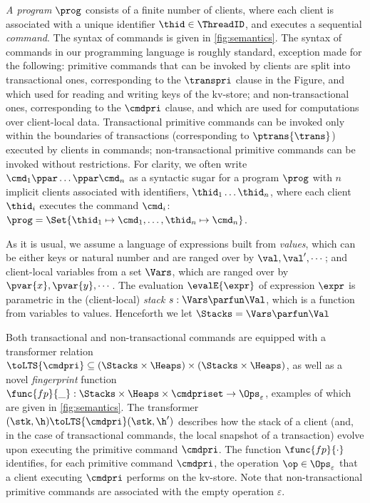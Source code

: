 \emph{A program} \( \prog \) consists of a finite number of clients, where each client is associated with a unique identifier \( \thid \in \ThreadID \), and executes a sequential \emph{command}. The syntax of commands is given in \cref{fig:semantics}. 
The syntax of commands in our programming language is roughly standard, exception made for the following: 
primitive commands that can be invoked by clients are split into transactional ones, corresponding to the $\transpri$ clause in the Figure, and which used for reading 
and writing keys of the kv-store; and non-transactional ones, corresponding to the $\cmdpri$ clause, and which are used for computations over client-local data. 
Transactional primitive commands can be invoked only within the boundaries of transactions (corresponding to $\ptrans{\trans}$) executed by clients in commands;
non-transactional primitive commands can be invoked without restrictions.
For clarity, we often write \( \cmd_{1}\ppar \dots \ppar \cmd_{n}\) as a syntactic sugar for a program \( \prog \) with $n$ implicit clients associated with identifiers, $\thid_1 \dots \thid_n$, where each client $\thid_i$ executes the command $\cmd_i$:  \( \prog = \Set{\thid_{1} \mapsto \cmd_{1}, \dots, \thid_{n} \mapsto \cmd_{n}  }\).

As it is usual, we assume a language of expressions 
built from \emph{values}, which can be either keys or natural number and are ranged over by $\val, \val', \cdots$; 
and client-local variables from a set $\Vars$, which are ranged over by $\pvar{x}, \pvar{y}, \cdots$. The evaluation $\evalE{\expr}$ of  expression 
$\expr$  is parametric in the (client-local) \emph{stack} $s: \Vars \parfun \Val$, which is a function from variables to values. 
Henceforth we let $\Stacks = \Vars \parfun \Val$

Both transactional and non-transactional commands are equipped with a transformer relation $\toLTS{\cmdpri} \subseteq 
(\Stacks \times \Heaps) \times (\Stacks \times \Heaps)$, as well as a 
novel \emph{fingerprint} function $\func{fp}{\_} : \Stacks \times \Heaps \times \cmdpriset \rightarrow \Ops_{\varepsilon}$, 
examples of which are given in \cref{fig:semantics}. 
The transformer $(\stk, \h)  \toLTS{\cmdpri} (\stk, \h')$ describes how the stack of a client (and, in the case of transactional commands, 
the local snapshot of a transaction) evolve upon executing the primitive command $\cmdpri$.
The function $\func{fp}{\cdot}$ identifies, for each primitive command $\cmdpri$, the operation $\op \in \Ops_{\varepsilon}$
that a client executing $\cmdpri$  performs on the kv-store. Note that non-transactional primitive commands are associated with 
the empty operation $\varepsilon$. 

